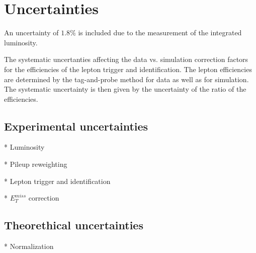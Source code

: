 \section{Uncertainties}

An uncertainty of $1.8\%$ is included due to the measurement of
the integrated luminosity.

The systematic uncertanties affecting the data vs. simulation correction factors
for the efficiencies of the lepton trigger and identification. The lepton
efficiencies are determined by the tag-and-probe method for data as well as for
simulation. The systematic uncertainty is then given by the uncertainty of
the ratio of the efficiencies.

\subsection{Experimental uncertainties}

* Luminosity

* Pileup reweighting

* Lepton trigger and identification

* $E_{T}^{miss}$ correction

\subsection{Theorethical uncertainties}

* Normalization







